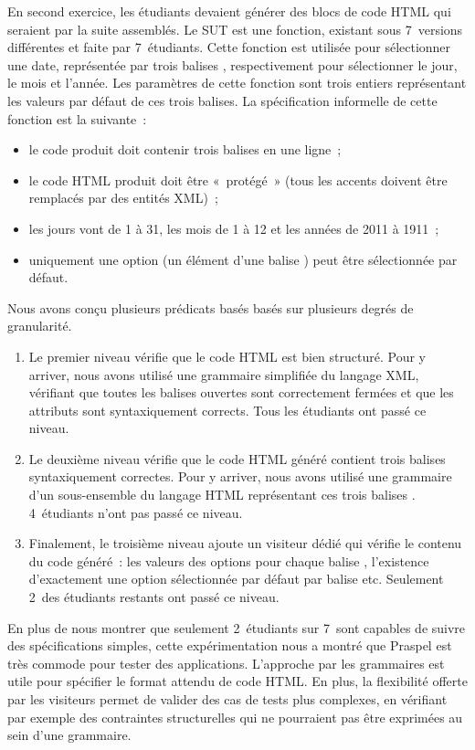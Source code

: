 En second exercice, les étudiants devaient générer des blocs de code HTML qui
seraient par la suite assemblés. Le SUT est une fonction, existant sous
7~versions différentes et faite par 7~étudiants. Cette fonction est utilisée
pour sélectionner une date, représentée par trois balises ,
respectivement pour sélectionner le jour, le mois et l'année. Les paramètres de
cette fonction sont trois entiers représentant les valeurs par défaut de ces
trois balises. La spécification informelle de cette fonction est la suivante~:
%
\begin{itemize}

\item le code produit doit contenir trois balises  en une ligne~;

\item le code HTML produit doit être «~protégé~» (tous les accents doivent être
remplacés par des entités XML)~;

\item les jours vont de 1 à 31, les mois de 1 à 12 et les années de 2011 à
1911~;

\item uniquement une option (un élément d'une balise ) peut être
sélectionnée par défaut.

\end{itemize}
%
Nous avons conçu plusieurs prédicats basés basés sur plusieurs degrés de
granularité.
%
\begin{enumerate}

\item Le premier niveau vérifie que le code HTML est bien structuré. Pour y
arriver, nous avons utilisé une grammaire simplifiée du langage XML, vérifiant
que toutes les balises ouvertes sont correctement fermées et que les attributs
sont syntaxiquement corrects. Tous les étudiants ont passé ce niveau.

\item Le deuxième niveau vérifie que le code HTML généré contient trois balises
 syntaxiquement correctes. Pour y arriver, nous avons utilisé une
grammaire d'un sous-ensemble du langage HTML représentant ces trois balises
. 4~étudiants n'ont pas passé ce niveau.

\item Finalement, le troisième niveau ajoute un visiteur dédié qui vérifie le
contenu du code généré~: les valeurs des options pour chaque balise
, l'existence d'exactement une option sélectionnée par défaut par
balise etc. Seulement 2~des étudiants restants ont passé ce niveau.

\end{enumerate}

En plus de nous montrer que seulement 2~étudiants sur 7~sont capables de suivre
des spécifications simples, cette expérimentation nous a montré que Praspel est
très commode pour tester des applications. L'approche par les grammaires est
utile pour spécifier le format attendu de code HTML. En plus, la flexibilité
offerte par les visiteurs permet de valider des cas de tests plus complexes, en
vérifiant par exemple des contraintes structurelles qui ne pourraient pas être
exprimées au sein d'une grammaire.
